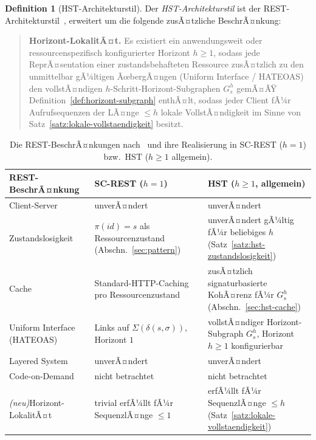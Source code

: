 ﻿\documentclass[a4paper,12pt]{article}
\theoremstyle{definition}
\newtheorem{definition}{Definition}
\begin{document}
\begin{definition}[HST-Architekturstil]
	\label{def:hst-architekturstil}
	Der \emph{HST-Architekturstil} ist der REST-Architekturstil~\cite{fielding2000},
	erweitert um die folgende zusÃ¤tzliche BeschrÃ¤nkung:
	\begin{quote}
		\textbf{Horizont-LokalitÃ¤t.} Es existiert ein anwendungsweit oder
		ressourcenspezifisch konfigurierter Horizont $h\ge1$, sodass jede
		ReprÃ¤sentation einer zustandsbehafteten Ressource zusÃ¤tzlich zu den unmittelbar
		gÃ¼ltigen ÃœbergÃ¤ngen (Uniform Interface / HATEOAS) den vollstÃ¤ndigen
		$h$-Schritt-Horizont-Subgraphen $G_s^h$ gemÃ¤ÃŸ
		Definition~\ref{def:horizont-subgraph} enthÃ¤lt, sodass jeder Client fÃ¼r
		Aufrufsequenzen der LÃ¤nge $\le h$ lokale VollstÃ¤ndigkeit im Sinne von
		Satz~\ref{satz:lokale-vollstaendigkeit} besitzt.
	\end{quote}
\end{definition}

\begin{table}[ht]
	\centering
	\renewcommand{\arraystretch}{1.35}
	\caption{Die REST-BeschrÃ¤nkungen nach~\cite{fielding2000} und ihre Realisierung in
	SC-REST ($h=1$) bzw.\ HST ($h\ge1$ allgemein).}
	\label{tab:rest-vergleich}
	\begin{tabular}{@{}p{3.3cm}p{5.55cm}p{5.55cm}@{}}
		\toprule
		REST-BeschrÃ¤nkung & SC-REST ($h=1$) & HST ($h\ge1$, allgemein) \\
		\midrule
		Client-Server & unverÃ¤ndert & unverÃ¤ndert \\
		Zustands\-losigkeit &
		$\pi(id)=s$ als Ressourcenzustand (Abschn.~\ref{sec:pattern}) &
		unverÃ¤ndert gÃ¼ltig fÃ¼r beliebiges $h$ (Satz~\ref{satz:hst-zustandslosigkeit}) \\
		Cache &
		Standard-HTTP-Caching pro Ressourcenzustand &
		zusÃ¤tzlich signaturbasierte KohÃ¤renz fÃ¼r $G_s^h$
		(Abschn.~\ref{sec:hst-cache}) \\
		Uniform Interface (\mbox{HATEOAS}) &
		Links auf $\Sigma(\delta(s,\sigma))$, Horizont $1$ &
		vollstÃ¤ndiger Horizont-Subgraph $G_s^h$, Horizont $h\ge1$ konfigurierbar \\
		Layered System & unverÃ¤ndert & unverÃ¤ndert \\
		Code-on-Demand & nicht betrachtet & nicht betrachtet \\
		\emph{(neu)}\newline Horizont-LokalitÃ¤t &
		trivial erfÃ¼llt fÃ¼r SequenzlÃ¤nge $\le1$ &
		erfÃ¼llt fÃ¼r SequenzlÃ¤nge $\le h$ (Satz~\ref{satz:lokale-vollstaendigkeit}) \\
		\bottomrule
	\end{tabular}
\end{table}
\end{document}
